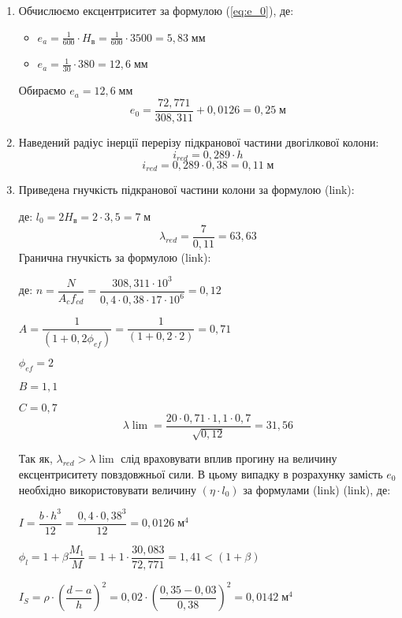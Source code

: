 \documentclass[a4paper,14pt]{article}
\begin{document}
\begin{enumerate}
    \item Обчислюємо ексцентриситет за формулою (\ref{eq:e_0}),
    де: \begin{itemize}
            \item $e_a = \frac{1}{600} \cdot H_\textit{в} =\frac{1}{600} \cdot 3500 = 5,83\;\textit{мм}$
            \item $e_a = \frac{1}{30} \cdot 380 = 12,6\;\textit{мм}$
        \end{itemize}
    Обираємо $e_a = 12,6\;\textit{мм}$
    $$e_0 = \frac{72,771}{308,311}+0,0126 = 0,25\;\textit{м}$$
\item Наведений радіус інерції перерізу підкранової частини двогілкової колони:
    \begin{equation}
        i_{red} = 0,289 \cdot h
    \end{equation}
    $$ i_{red} = 0,289 \cdot 0,38 = 0,11\;\textit{м}$$
\item Приведена гнучкість підкранової частини колони за формулою (link):
    
    де: $l_0 = 2H_\textit{в} = 2 \cdot 3,5 = 7\;\textit{м}$
    $$\lambda_{red} = \frac{7}{0,11} = 63,63$$
    Гранична гнучкість за формулою (link):
    
    де: $n = \dfrac{N}{A_cf_{cd}} = \dfrac{308,311 \cdot 10^3}{0,4 \cdot 0,38 \cdot 17 \cdot 10^6} = 0,12$

        $A = \dfrac{1}{(1+0,2\phi_{ef})} = \dfrac{1}{(1+0,2 \cdot 2)} = 0,71$

        $\phi_{ef} = 2$

        $B = 1,1$

        $C = 0,7$
        $$\lambda\lim = \frac{20 \cdot 0,71 \cdot 1,1 \cdot 0,7}{\sqrt{0,12}} = 31,56$$

    Так як, $\lambda_{red} > \lambda\lim$ слід враховувати вплив прогину на величину ексцентриситету повздовжньої сили. В цьому випадку в розрахунку замість $e_0$ необхідно використовувати
    величину $(\eta \cdot l_0)$ за формулами (link) (link), де: 
    
    $I = \dfrac{b \cdot h^3}{12} = \dfrac{0,4 \cdot 0,38^3}{12} = 0,0126\;\textit{м}^4$

    $\phi_l = 1 + \beta \dfrac{M_1}{M} = 1 + 1 \cdot \dfrac{30,083}{72,771} = 1,41 < (1 + \beta)$

    $I_S = \rho \cdot \left(\dfrac{d - a}{h}\right)^2 = 0,02 \cdot \left(\dfrac{0,35 - 0,03}{0,38}\right)^2 = 0,0142\;\textit{м}^4$


\end{enumerate}
\end{document}
